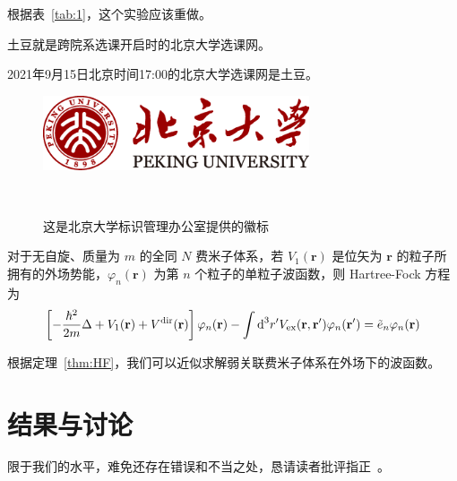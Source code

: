 \documentclass[cn,hazy,pku,12pt,normal,math=newtx,cite=super]{elegantnote}
\begin{document}
根据表~\ref{tab:1}，这个实验应该重做。


\begin{definition}[土豆]
	土豆就是跨院系选课开启时的北京大学选课网。
\end{definition}

\begin{example}
	2021年9月15日北京时间17:00的北京大学选课网是土豆。
\end{example}


\begin{figure}[htbp]
	\centering
	\includegraphics[width=0.7\textwidth]{images/logo_pku.png}
	
	\
	
	\caption{这是北京大学标识管理办公室提供的徽标}
	\label{fig:1}%
\end{figure}


\begin{theorem}\label{thm:HF}
对于无自旋、质量为 $m$ 的全同 $N$ 费米子体系，若 $V_1(\mathbf r)$ 是位矢为 $\mathbf r$ 的粒子所拥有的外场势能，$\varphi_n(\mathbf r)$ 为第 $n$ 个粒子的单粒子波函数，则 Hartree-Fock 方程为
\begin{equation}\label{eq:HF}
  \left[-\frac{\hbar^2}{2m}\Delta+V_1(\mathbf r)+V^{\text{dir}}(\mathbf r)\right]\varphi_n(\mathbf r)-\int\text d^3r'V_\text{ex}(\mathbf r,\mathbf r')\varphi_n(\mathbf r')=\tilde e_n\varphi_n(\mathbf r)
\end{equation}
\end{theorem}


根据定理~\ref{thm:HF}，我们可以近似求解弱关联费米子体系在外场下的波函数。


\section{结果与讨论}

限于我们的水平，难免还存在错误和不当之处，恳请读者批评指正~\cite{pcl2002}。


\nocite{*}

\end{document}
